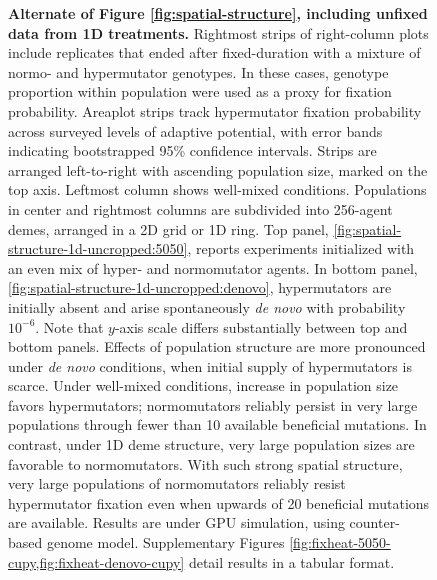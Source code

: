 \begin{figure}[h]
\begin{minipage}{\textwidth}
  \end{minipage}

  \vspace{-10ex}

  \begin{minipage}{\textwidth}
    \caption{%
      \textbf{Alternate of Figure \ref{fig:spatial-structure}, including unfixed data from 1D treatments.}
      \footnotesize
      Rightmost strips of right-column plots include replicates that ended after fixed-duration with a mixture of normo- and hypermutator genotypes.
      In these cases, genotype proportion within population were used as a proxy for fixation probability.
      Areaplot strips track hypermutator fixation probability across surveyed levels of adaptive potential, with error bands indicating bootstrapped 95\% confidence intervals.
      Strips are arranged left-to-right with ascending population size, marked on the top axis.
      Leftmost column shows well-mixed conditions.
      Populations in center and rightmost columns are subdivided into 256-agent demes, arranged in a 2D grid or 1D ring.
      Top panel, \ref{fig:spatial-structure-1d-uncropped:5050}, reports experiments initialized with an even mix of hyper- and normomutator agents.
      In bottom panel, \ref{fig:spatial-structure-1d-uncropped:denovo}, hypermutators are initially absent and arise spontaneously \textit{de novo} with probability $10^{-6}$.
      Note that $y$-axis scale differs substantially between top and bottom panels.
      Effects of population structure are more pronounced under \textit{de novo} conditions, when initial supply of hypermutators is scarce.
      Under well-mixed conditions, increase in population size favors hypermutators; normomutators reliably persist in very large populations through fewer than 10 available beneficial mutations.
      In contrast, under 1D deme structure, very large population sizes are favorable to normomutators.
      With such strong spatial structure, very large populations of normomutators reliably resist hypermutator fixation even when upwards of 20 beneficial mutations are available.
      Results are under GPU simulation, using counter-based genome model.
      Supplementary Figures \cref{fig:fixheat-5050-cupy,fig:fixheat-denovo-cupy} detail results in a tabular format.
    }
    \label{fig:spatial-structure-1d-uncropped}
  \end{minipage}
\end{figure}
